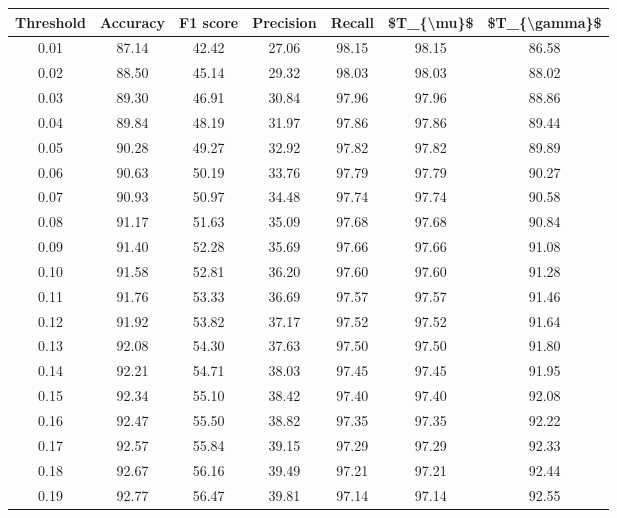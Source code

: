 \begin{tabular}{|c|c|c|c|c|c|c|}
\hline
 Threshold &  Accuracy &  F1 score &  Precision &  Recall &  \$T\_\{\textbackslash mu\}\$ &  \$T\_\{\textbackslash gamma\}\$ \\
\hline
      0.01 &     87.14 &     42.42 &      27.06 &   98.15 &      98.15 &         86.58 \\
      0.02 &     88.50 &     45.14 &      29.32 &   98.03 &      98.03 &         88.02 \\
      0.03 &     89.30 &     46.91 &      30.84 &   97.96 &      97.96 &         88.86 \\
      0.04 &     89.84 &     48.19 &      31.97 &   97.86 &      97.86 &         89.44 \\
      0.05 &     90.28 &     49.27 &      32.92 &   97.82 &      97.82 &         89.89 \\
      0.06 &     90.63 &     50.19 &      33.76 &   97.79 &      97.79 &         90.27 \\
      0.07 &     90.93 &     50.97 &      34.48 &   97.74 &      97.74 &         90.58 \\
      0.08 &     91.17 &     51.63 &      35.09 &   97.68 &      97.68 &         90.84 \\
      0.09 &     91.40 &     52.28 &      35.69 &   97.66 &      97.66 &         91.08 \\
      0.10 &     91.58 &     52.81 &      36.20 &   97.60 &      97.60 &         91.28 \\
      0.11 &     91.76 &     53.33 &      36.69 &   97.57 &      97.57 &         91.46 \\
      0.12 &     91.92 &     53.82 &      37.17 &   97.52 &      97.52 &         91.64 \\
      0.13 &     92.08 &     54.30 &      37.63 &   97.50 &      97.50 &         91.80 \\
      0.14 &     92.21 &     54.71 &      38.03 &   97.45 &      97.45 &         91.95 \\
      0.15 &     92.34 &     55.10 &      38.42 &   97.40 &      97.40 &         92.08 \\
      0.16 &     92.47 &     55.50 &      38.82 &   97.35 &      97.35 &         92.22 \\
      0.17 &     92.57 &     55.84 &      39.15 &   97.29 &      97.29 &         92.33 \\
      0.18 &     92.67 &     56.16 &      39.49 &   97.21 &      97.21 &         92.44 \\
      0.19 &     92.77 &     56.47 &      39.81 &   97.14 &      97.14 &         92.55 \\

\end{tabular}
